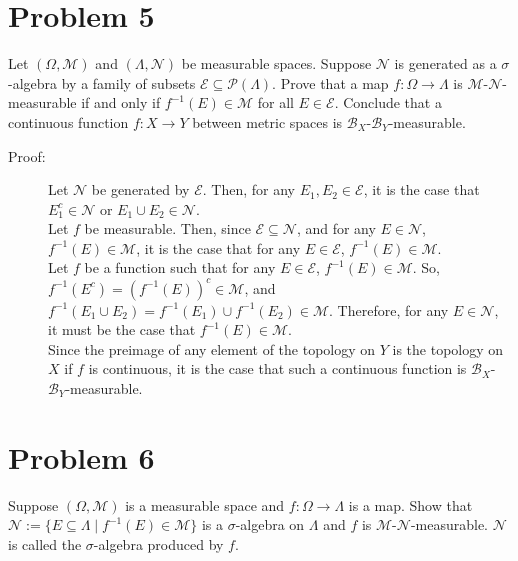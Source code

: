 \documentclass[10pt]{extarticle}
\begin{document}
  \section{Problem 5}%
  Let $(\Omega,\mathcal{M})$ and $(\Lambda,\mathcal{N})$ be measurable spaces. Suppose $\mathcal{N}$ is generated as a $\sigma$-algebra by a family of subsets $\mathcal{E}\subseteq \mathcal{P}(\Lambda)$. Prove that a map $f:\Omega \rightarrow \Lambda$ is $\mathcal{M}$-$\mathcal{N}$-measurable if and only if $f^{-1}(E)\in \mathcal{M}$ for all $E\in \mathcal{E}$. Conclude that a continuous function $f: X\rightarrow Y$ between metric spaces is $\mathcal{B}_{X}$-$\mathcal{B}_{Y}$-measurable.
  \begin{description}
    \item[Proof:] Let $\mathcal{N}$ be generated by $\mathcal{E}$. Then, for any $E_1,E_2\in \mathcal{E}$, it is the case that $E_1^{c}\in \mathcal{N}$ or $E_1\cup E_2\in \mathcal{N}$.\\

      Let $f$ be measurable. Then, since $\mathcal{E}\subseteq \mathcal{N}$, and for any $E\in \mathcal{N}$, $f^{-1}(E)\in \mathcal{M}$, it is the case that for any $E\in \mathcal{E}$, $f^{-1}(E)\in \mathcal{M}$.\\

      Let $f$ be a function such that for any $E\in \mathcal{E}$, $f^{-1}(E)\in \mathcal{M}$. So, $f^{-1}(E^{c}) = \left(f^{-1}(E)\right)^c \in \mathcal{M}$, and $f^{-1}(E_1\cup E_2) = f^{-1}(E_1)\cup f^{-1}(E_2) \in \mathcal{M}$. Therefore, for any $E\in \mathcal{N}$, it must be the case that $f^{-1}(E)\in \mathcal{M}$.\\

      Since the preimage of any element of the topology on $Y$ is the topology on $X$ if $f$ is continuous, it is the case that such a continuous function is $\mathcal{B}_{X}$-$\mathcal{B}_{Y}$-measurable.
  \end{description}
  \section{Problem 6}%
  Suppose $(\Omega,\mathcal{M})$ is a measurable space and $f: \Omega \rightarrow \Lambda$ is a map. Show that $\mathcal{N}:= \{E\subseteq \Lambda\mid f^{-1}(E)\in \mathcal{M}\}$ is a $\sigma$-algebra on $\Lambda$ and $f$ is $\mathcal{M}$-$\mathcal{N}$-measurable. $\mathcal{N}$ is called the $\sigma$-algebra produced by $f$.
\end{document}
